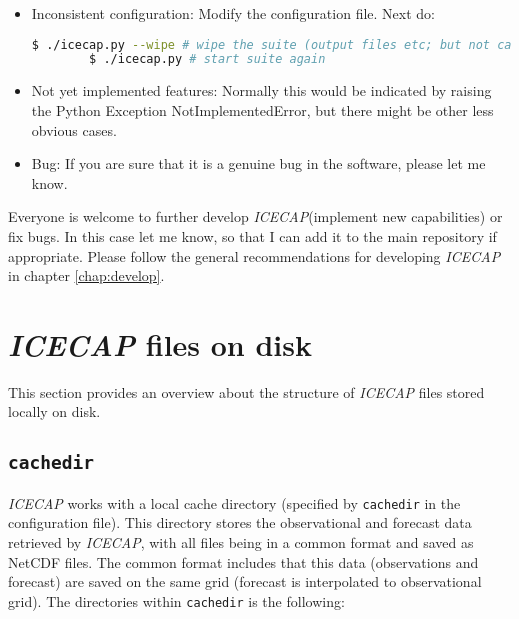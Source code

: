 \documentclass[DIV=10, parskip=full]{scrreprt}
\newcommand{\ice}{\textit{ICECAP}\xspace}
\begin{document}
\begin{itemize}
	\item Inconsistent configuration: Modify the configuration file. Next do:
		\begin{lstlisting}[language=bash]
		$ ./icecap.py --wipe # wipe the suite (output files etc; but not cache)
		$ ./icecap.py # start suite again
	\end{lstlisting}
	\item Not yet implemented features: Normally this would be indicated by raising the Python Exception NotImplementedError, but there might be other less obvious cases.
	\item Bug: If you are sure that it is a genuine bug in the software, please let me know.
\end{itemize}

Everyone is welcome to further develop \ice (implement new capabilities) or fix bugs. In this case let me know, so that I can add it to the main repository if appropriate. Please follow the general recommendations for developing \ice in chapter \ref{chap:develop}.


\chapter{\ice files on disk} \label{chap:files}
This section provides an overview about the structure of \ice files stored locally on disk. 

\section{\texttt{cachedir}}

\ice works with a local cache directory (specified by \texttt{cachedir} in the configuration file). This directory stores the observational and forecast data retrieved by \ice, with all files being in a common format and saved as NetCDF files. The common format includes that this data (observations and forecast) are saved on the same grid (forecast is interpolated to observational grid). The directories within \texttt{cachedir} is the following:\\

\end{document}
